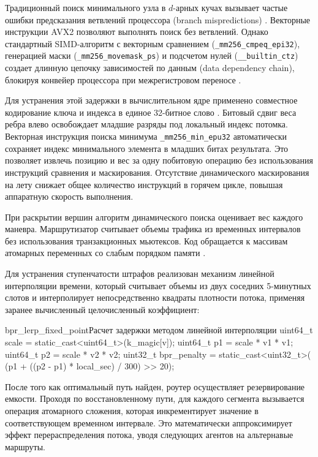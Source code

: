 Традиционный поиск минимального узла в $d$-арных кучах вызывает частые ошибки предсказания ветвлений процессора (branch mispredictions) \cite{biggar_sorting}. Векторные инструкции AVX2 позволяют выполнять поиск без ветвлений. Однако стандартный SIMD-алгоритм с векторным сравнением (\texttt{\_mm256\_cmpeq\_epi32}), генерацией маски (\texttt{\_mm256\_movemask\_ps}) и подсчетом нулей (\texttt{\_\_builtin\_ctz}) создает длинную цепочку зависимостей по данным (data dependency chain), блокируя конвейер процессора при межрегистровом переносе \cite{fog_optimizing_cpp}.

Для устранения этой задержки в вычислительном ядре применено совместное кодирование ключа и индекса в единое 32-битное слово \cite{kusswurm2014modern}. Битовый сдвиг веса ребра влево освобождает младшие разряды под локальный индекс потомка. Векторная инструкция поиска минимума \texttt{\_mm256\_min\_epu32} автоматически сохраняет индекс минимального элемента в младших битах результата. Это позволяет извлечь позицию и вес за одну побитовую операцию без использования инструкций сравнения и маскирования. Отсутствие динамического маскирования на лету снижает общее количество инструкций в горячем цикле, повышая аппаратную скорость выполнения.

При раскрытии вершин алгоритм динамического поиска оценивает вес каждого маневра. Маршрутизатор считывает объемы трафика из временных интервалов без использования транзакционных мьютексов. Код обращается к массивам атомарных переменных со слабым порядком памяти \cite{cpp_p2055r1, cpp_p0668r5}. 

Для устранения ступенчатости штрафов реализован механизм линейной интерполяции времени, который считывает объемы из двух соседних 5-минутных слотов и интерполирует непосредственно квадраты плотности потока, применяя заранее вычисленный целочисленный коэффициент:
\begin{plaincode}{bpr_lerp_fixed_point}{Расчет задержки методом линейной интерполяции}
uint64_t scale = static_cast<uint64_t>(k_magic[v]);
uint64_t p1 = scale * v1 * v1;
uint64_t p2 = scale * v2 * v2;
uint32_t bpr_penalty = static_cast<uint32_t>(
    (p1 + ((p2 - p1) * local_sec) / 300) >> 20);
\end{plaincode}

После того как оптимальный путь найден, роутер осуществляет резервирование емкости. Проходя по восстановленному пути, для каждого сегмента вызывается операция атомарного сложения, которая инкрементирует значение в соответствующем временном интервале. Это математически аппроксимирует эффект перераспределения потока, уводя следующих агентов на альтернавые маршруты.

